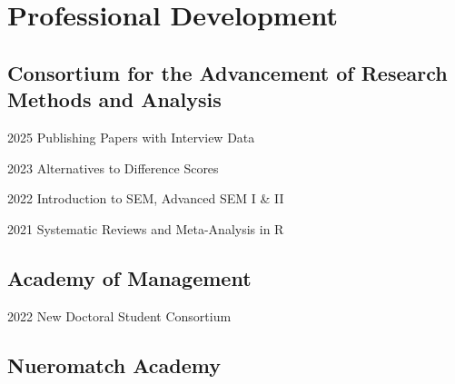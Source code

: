 \documentclass[12pt,letterpaper]{report} %
\begin{document}






    \section*{Professional Development}

    \subsection*{Consortium for the Advancement of Research Methods and Analysis}

    \begin{tablist}
    
        \item[2025]\tab{}Publishing Papers with Interview Data
        \item[2023]\tab{}Alternatives to Difference Scores
        \item[2022]\tab{}Introduction to SEM, Advanced SEM I \& II
        \item[2021]\tab{}Systematic Reviews and Meta-Analysis in R

    \end{tablist}

    \subsection*{Academy of Management}

    \begin{tablist}
        \item[2022]\tab{}New Doctoral Student Consortium
        
    \end{tablist}

    \subsection*{Nueromatch Academy}
\end{document}
